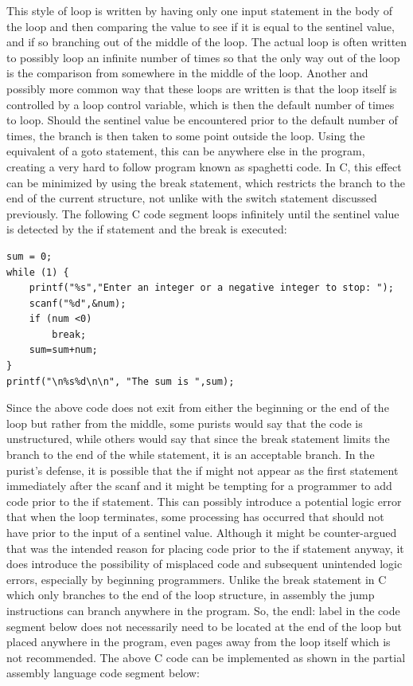 \documentclass[10pt]{book}
\begin{document}
This style of loop is written by having only one input statement in the body of the loop and then comparing the value to see if it is equal to the sentinel value, and if so branching out of the middle of the loop. The actual loop is often written to possibly loop an infinite number of times so that the only way out of the loop is the comparison from somewhere in the middle of the loop. Another and possibly more common way that these loops are written is that the loop itself is controlled by a loop control variable, which is then the default number of times to loop. Should the sentinel value be encountered prior to the default number of times, the branch is then taken to some point outside the loop. Using the equivalent of a goto statement, this can be anywhere else in the program, creating a very hard to follow program known as spaghetti code. In C, this effect can be minimized by using the break statement, which restricts the branch to the end of the current structure, not unlike with the switch statement discussed previously. The following C code segment loops infinitely until the sentinel value is detected by the if statement and the break is executed:

\begin{verbatim}
sum = 0;
while (1) {
    printf("%s","Enter an integer or a negative integer to stop: ");
    scanf("%d",&num);
    if (num <0)
        break;
    sum=sum+num;
}
printf("\n%s%d\n\n", "The sum is ",sum);
\end{verbatim}

Since the above code does not exit from either the beginning or the end of the loop but rather from the middle, some purists would say that the code is unstructured, while others would say that since the break statement limits the branch to the end of the while statement, it is an acceptable branch. In the purist's defense, it is possible that the if might not appear as the first statement immediately after the scanf and it might be tempting for a programmer to add code prior to the if statement. This can possibly introduce a potential logic error that when the loop terminates, some processing has occurred that should not have prior to the input of a sentinel value. Although it might be counter-argued that was the intended reason for placing code prior to the if statement anyway, it does introduce the possibility of misplaced code and subsequent unintended logic errors, especially by beginning programmers.
Unlike the break statement in C which only branches to the end of the loop structure, in assembly the jump instructions can branch anywhere in the program. So, the endl: label in the code segment below does not necessarily need to be located at the end of the loop but placed anywhere in the program, even pages away from the loop itself which is not recommended. The above C code can be implemented as shown in the partial assembly language code segment below:
\end{document}
